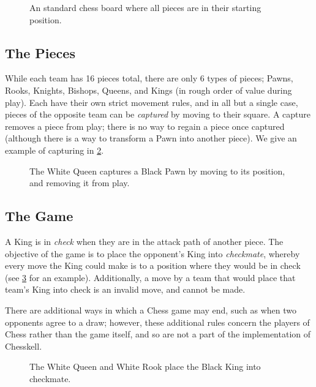 \begin{figure}[h]
    \centering
    \newgame
    \showboard
    \caption{An standard chess board where all pieces are in their starting position.}
    \label{startboard}
\end{figure}

\subsection{The Pieces}

While each team has 16 pieces total, there are only 6 types of pieces; Pawns, Rooks, Knights, Bishops, Queens, and Kings (in rough order of value during play). Each have their own strict movement rules, and in all but a single case, pieces of the opposite team can be \emph{captured} by moving to their square. A capture removes a piece from play; there is no way to regain a piece once captured (although there is a way to transform a Pawn into another piece). We give an example of capturing in \cref{capture}.

\begin{figure}[h]
    \centering
    \showboard
    \quad
    \showboard
    \caption{The White Queen captures a Black Pawn by moving to its position, and removing it from play.}
    \label{capture}
\end{figure}

\subsection{The Game}

A King is in \emph{check} when they are in the attack path of another piece. The objective of the game is to place the opponent's King into \emph{checkmate}, whereby every move the King could make is to a position where they would be in check (see \cref{checkmate} for an example). Additionally, a move by a team that would place that team's King into check is an invalid move, and cannot be made.

There are additional ways in which a Chess game may end, such as when two opponents agree to a draw; however, these additional rules concern the players of Chess rather than the game itself, and so are not a part of the implementation of Chesskell.

\begin{figure}[h]
    \centering
    \showboard
    \caption{The White Queen and White Rook place the Black King into checkmate.}
    \label{checkmate}
\end{figure}

